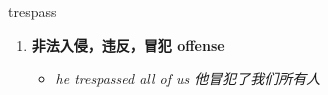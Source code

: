 
\begin{frame}
{\huge trespass}
\begin{center}
\begin{enumerate}\Large
  \item \textbf{非法入侵，违反，冒犯 offense}
  \begin{itemize}
    \item \em{\Large{he trespassed all of us 他冒犯了我们所有人}}
  \end{itemize}
\end{enumerate}
\end{center}
\end{frame}
